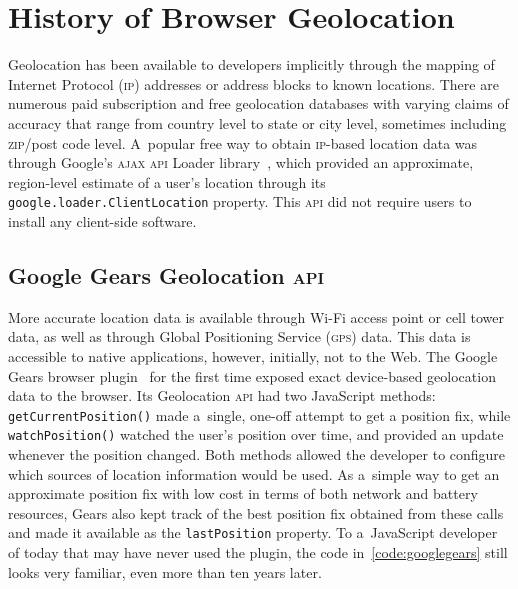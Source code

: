 \documentclass[sigconf,hyphens]{acmart}
\begin{document}
\maketitle

\section{History of Browser Geolocation}

Geolocation has been available to developers implicitly through the mapping of
Internet Protocol (\textsc{ip}) addresses or address blocks to known locations.
There are numerous paid subscription and free geolocation databases
with varying claims of accuracy that range from country level to state or city level,
sometimes including \textsc{zip}/post code level.
A~popular free way to obtain \textsc{ip}-based location data was
through Google's \textsc{ajax} \textsc{api} Loader library~\cite{block2008gears},
which provided an approximate, region-level estimate of a user's location
through its \texttt{google.loader.ClientLocation} property.
This \textsc{api} did not require users to install any client-side software.

\subsection{Google Gears Geolocation \textsc{api}}
\label{sec:googlegears}

More accurate location data is available through Wi-Fi access point or cell tower data,
as well as through Global Positioning Service (\textsc{gps}) data.
This data is accessible to native applications, however, initially, not to the Web.
The Google Gears browser plugin~\cite{gears2008geolocation} for the first time exposed
exact device-based geolocation data to the browser. 
Its Geolocation \textsc{api} had two JavaScript methods:
\texttt{getCurrentPosition()} made a~single, one-off attempt to get a position fix,
while \texttt{watchPosition()} watched the user's position over time,
and provided an update whenever the position changed.
Both methods allowed the developer to configure
which sources of location information would be used.
As a~simple way to get an approximate position fix with low cost
in terms of both network and battery resources,
Gears also kept track of the best position fix obtained from these calls
and made it available as the \texttt{lastPosition} property.
To a~JavaScript developer of today that may have never used the plugin,
the code in~\autoref{code:googlegears} still looks very familiar,
even more than ten years later.
\end{document}
